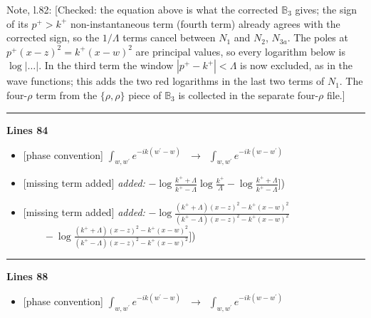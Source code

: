 \documentclass[10pt]{article}
\newenvironment{notebox}{\def\FrameCommand{{\color{notebar}\vrule width 1.5pt}\hspace{6pt}}\MakeFramed{\advance\hsize-\width\FrameRestore}\small}{\endMakeFramed}
\def\mf#1{\mathbb{#1}}
\begin{document}
\begin{notebox}\textsf{\small Note, l.82:} [Checked: the equation above is what the corrected $\mf{B}_{3}$ gives; the sign of its $p^{+}>k^{+}$ non-instantaneous term (fourth term) already agrees with the corrected sign, so the $1/\Lambda$ terms cancel between $N_{1}$ and $N_{2}$, $N_{3a}$. The poles at $p^{+}(x-z)^{2}=k^{+}(x-w)^{2}$ are principal values, so every logarithm below is $\log|\dots|$. In the third term the window $|p^{+}-k^{+}|<\Lambda$ is now excluded, as in the wave functions; this adds the two red logarithms in the last two terms of $N_{1}$. The four-$\rho$ term from the $\{\rho,\rho\}$ piece of $\mf{B}_{3}$ is collected in the separate four-$\rho$ file.]\end{notebox}
\noindent\rule{\linewidth}{0.3pt}\par\noindent\textbf{Lines 84} \par
\begin{itemize}[leftmargin=2.2em,itemsep=1pt,topsep=2pt]
\item[\textbf{l.84}] \textsf{\small [phase convention]} $\displaystyle \int_{w, w^\prime} e^{-ik(w^\prime-w)}\,$\ $\longrightarrow$\ $\displaystyle \int_{w, w^\prime} e^{-ik(w-w^\prime)}\,$
\item[\textbf{l.84}] \textsf{\small [missing term added]} \emph{added:} $\displaystyle -\log\frac{k^{+}+\Lambda}{k^{+}-\Lambda}$$\displaystyle \log\frac{k^{+}}{\Lambda}-\log\frac{k^{+}+\Lambda}{k^{+}-\Lambda}\Big]${\color{gray}\small)}
\item[\textbf{l.84}] \textsf{\small [missing term added]} \emph{added:} $\displaystyle -\log\frac{(k^{+}+\Lambda)(x-z)^{2}-k^{+}(x-w)^{2}}{(k^{+}-\Lambda)(x-z)^{2}-k^{+}(x-w)^{2}}$$\displaystyle \qquad-\log\frac{(k^{+}+\Lambda)(x-z)^{2}-k^{+}(x-w)^{2}}{(k^{+}-\Lambda)(x-z)^{2}-k^{+}(x-w)^{2}}\Big]${\color{gray}\small)}
\end{itemize}
\noindent\rule{\linewidth}{0.3pt}\par\noindent\textbf{Lines 88} \par
\begin{itemize}[leftmargin=2.2em,itemsep=1pt,topsep=2pt]
\item[\textbf{l.88}] \textsf{\small [phase convention]} $\displaystyle \int_{w, w^\prime} e^{-ik(w^\prime-w)}\,$\ $\longrightarrow$\ $\displaystyle \int_{w, w^\prime} e^{-ik(w-w^\prime)}\,$
\end{itemize}
\end{document}
